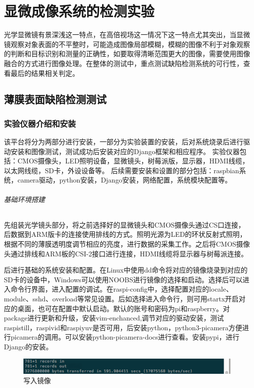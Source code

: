 \chapter{显微成像系统的检测实验}


光学显微镜有景深浅这一特点，在高倍视场这一情况下这一特点尤其突出，当显微镜观察对象表面的不平整时，可能造成图像局部模糊，模糊的图像不利于对象观察的判断和目标识别和测量的正确性，如要取得清晰范围更大的图像，需要使用图像融合的方式进行图像处理。在整体的测试中，重点测试缺陷检测系统的可行性，查看最后的结果相关判定。

\section{薄膜表面缺陷检测测试}

\subsection{实验仪器介绍和安装}
该平台将分为两部分进行安装，一部分为实验装置的安装，后对系统烧录后进行驱动安装和图像测试，测试成功后安装对应的Django框架和相应程序。
实验仪器包括：CMOS摄像头，LED照明设备，显微镜头，树莓派版，显示器，HDMI线缆，以太网线缆，SD卡，外设设备等。
后续需要安装和设置的部分包括：raspbian系统，camera驱动，python安装，Django安装，网络配置，系统模块配置等。
\subparagraph{基础环境搭建}

先组装光学镜头部分，将之前选择好的显微镜头和CMOS摄像头通过CS口连接，后数据到ARM版卡的连接使用排线的方式。照明光源为LED的环状反射式照明，根据不同的薄膜透明度调节相应的亮度，进行数据的采集工作。之后将CMOS摄像头通过排线和ARM板的CSI-2接口进行连接，HDMI线缆将显示器与树莓派连接。

后进行基础的系统安装和配置。在Linux中使用dd命令将对应的镜像烧录到对应的SD卡的设备中，Windows可以使用NOOBS进行镜像的选择和启动。选择后可以进入命令行界面，进入配置的调试。在raspi-config中，选择配置对应的locale、module、sshd、overload等常见设置。后如选择进入命令行，则可用startx开启对应的桌面，也可在配置中默认启动。默认的账号和密码为pi和raspberry。对package进行更新和升级，安装vim-enchanced,调节对应的驱动安装，测试raspistill，raspivid和raspiyuv是否可用，后安装python，python3-picamera方便进行picamera的调用。可以安装python-picamera-docs进行查看。安装pypi，进行Django的安装。
\begin{figure}[h]
\centering
\includegraphics[width=0.7\linewidth]{Figure/rasp_dd}
\caption{写入镜像}
\label{fig:rasp_dd}
\end{figure}


